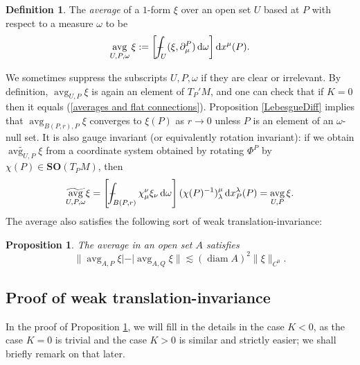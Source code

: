 \documentclass[reqno,11pt]{amsart}
\newcommand{\SpOrth}{\mathbf{SO}}
\DeclareMathOperator{\avg}{avg}
\DeclareMathOperator{\diam}{diam}
\newcommand*\dif{\mathop{}\!\mathrm{d}}
\newcommand{\dfn}[1]{\emph{#1}\index{#1}}
\newtheorem{proposition}[theorem]{Proposition}
\theoremstyle{definition}
\newtheorem{definition}[theorem]{Definition}
\numberwithin{equation}{section}
\def\Xint#1{\mathchoice
{\XXint\displaystyle\textstyle{#1}}%
{\XXint\textstyle\scriptstyle{#1}}%
{\XXint\scriptstyle\scriptscriptstyle{#1}}%
{\XXint\scriptscriptstyle\scriptscriptstyle{#1}}%
\!\int}
\def\XXint#1#2#3{{\setbox0=\hbox{$#1{#2#3}{\int}$ }
\vcenter{\hbox{$#2#3$ }}\kern-.6\wd0}}
\def\dashint{\Xint-}
\begin{document}
\begin{definition}
The \dfn{average} of a $1$-form $\xi$ over an open set $U$ based at $P$ with respect to a measure $\omega$ to be
$$\avg_{U, P, \omega} \xi := \left[\dashint_U (\xi, \partial^P_\mu) \dif \omega\right] \dif x^\mu(P).$$
\end{definition}

We sometimes suppress the subscripts $U, P, \omega$ if they are clear or irrelevant.
By definition, $\avg_{U, P} \xi$ is again an element of $T_P'M$, and one can check that if $K = 0$ then it equals (\ref{averages and flat connections}).
Proposition \ref{LebesgueDiff} implies that $\avg_{B(P, r), P} \xi$ converges to $\xi(P)$ as $r \to 0$ unless $P$ is an element of an $\omega$-null set.
It is also gauge invariant (or equivalently rotation invariant): if we obtain $\widetilde{\avg_{U, P}} \xi$ from a coordinate system obtained by rotating $\Phi^P$ by $\chi(P) \in \SpOrth(T_PM)$, then
$$\widetilde{\avg_{U, P, \omega}} \xi = \left[\dashint_{B(P, r)} \chi^\nu_\mu \xi_\nu \dif \omega\right] (\chi(P)^{-1})_\lambda^\mu \dif x^\lambda_P(P) = \avg_{U, P} \xi.$$
The average also satisfies the following sort of weak translation-invariance:

\begin{proposition}\label{translation invariance}
The average in an open set $A$ satisfies
$$\|\avg_{A, P} \xi| - |\avg_{A, Q} \xi\| \lesssim (\diam A)^2 \|\xi\|_{C^0}.$$
\end{proposition}

\subsection{Proof of weak translation-invariance}
In the proof of Proposition \ref{translation invariance}, we will fill in the details in the case $K < 0$, as the case $K = 0$ is trivial and the case $K > 0$ is similar and strictly easier; we shall briefly remark on that later.
\end{document}

